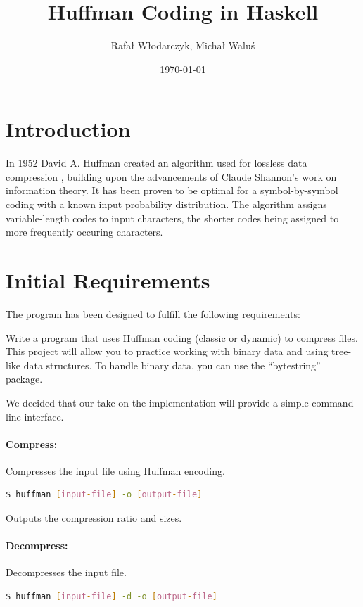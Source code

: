 \documentclass{article}
\begin{document}
\title{Huffman Coding in Haskell}
\author{Rafał Włodarczyk, Michał Waluś}
\date{\today}

\maketitle

\tableofcontents
\newpage

\section{Introduction}
In 1952 David A. Huffman created an algorithm used for lossless data compression \cite{huffman1952method}, 
building upon the advancements of Claude Shannon's work on information theory.
It has been proven to be optimal for a symbol-by-symbol coding with a known 
input probability distribution. The algorithm assigns variable-length codes to 
input characters, the shorter codes being assigned to more frequently occuring characters.

\section{Initial Requirements}

The program has been designed to fulfill the following requirements:

Write a program that uses Huffman coding (classic or dynamic) to compress files.
This project will allow you to practice working with binary data and using tree-like data structures.
To handle binary data, you can use the “bytestring” package.

We decided that our take on the implementation will provide a simple command line interface.

\paragraph{Compress:} Compresses the input file using Huffman encoding.
\begin{lstlisting}[language=bash]
$ huffman [input-file] -o [output-file]
\end{lstlisting}
Outputs the compression ratio and sizes.

\paragraph{Decompress:} Decompresses the input file.
\begin{lstlisting}[language=bash]
$ huffman [input-file] -d -o [output-file]
\end{lstlisting}
\end{document}
